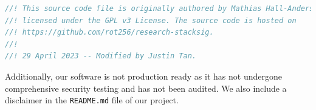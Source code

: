 \begin{lstlisting}[language=rust]
//! This source code file is originally authored by Mathias Hall-Andersen and
//! licensed under the GPL v3 License. The source code is hosted on
//! https://github.com/rot256/research-stacksig.
//!
//! 29 April 2023 -- Modified by Justin Tan.
\end{lstlisting}

Additionally, our software is not production ready as it has not undergone comprehensive security testing and has not been audited. We also include a disclaimer in the \texttt{README.md} file of our project. 
